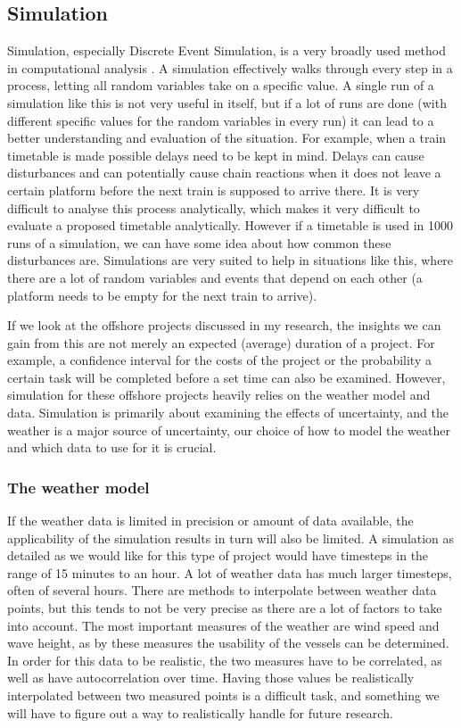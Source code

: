 \documentclass[a4paper,12pt]{article}
\begin{document}
\subsection{Simulation} \label{ss:sim}
Simulation, especially Discrete Event Simulation, is a very broadly used method in computational analysis \cite{law2000simulation,robinson2010conceptual}. A simulation effectively walks through every step in a process, letting all random variables take on a specific value. A single run of a simulation like this is not very useful in itself, but if a lot of runs are done (with different specific values for the random variables in every run) it can lead to a better understanding and evaluation of the situation. For example, when a train timetable is made possible delays need to be kept in mind. Delays can cause disturbances and can potentially cause chain reactions when it does not leave a certain platform before the next train is supposed to arrive there. It is very difficult to analyse this process analytically, which makes it very difficult to evaluate a proposed timetable analytically. However if a timetable is used in 1000 runs of a simulation, we can have some idea about how common these disturbances are. Simulations are very suited to help in situations like this, where there are a lot of random variables and events that depend on each other (a platform needs to be empty for the next train to arrive). 

If we look at the offshore projects discussed in my research, the insights we can gain from this are not merely an expected (average) duration of a project. For example, a confidence interval for the costs of the project or the probability a certain task will be completed before a set time can also be examined. However, simulation for these offshore projects heavily relies on the weather model and data. Simulation is primarily about examining the effects of uncertainty, and the weather is a major source of uncertainty, our choice of how to model the weather and which data to use for it is crucial. 

\subsubsection{The weather model} \label{sss:weather}
If the weather data is limited in precision or amount of data available, the applicability of the simulation results in turn will also be limited. A simulation as detailed as we would like for this type of project would have timesteps in the range of 15 minutes to an hour. A lot of weather data has much larger timesteps, often of several hours. There are methods to interpolate between weather data points, but this tends to not be very precise as there are a lot of factors to take into account. The most important measures of the weather are wind speed and wave height, as by these measures the usability of the vessels can be determined. In order for this data to be realistic, the two measures have to be correlated, as well as have autocorrelation over time. Having those values be realistically interpolated between two measured points is a difficult task, and something we will have to figure out a way to realistically handle for future research.
\end{document}
